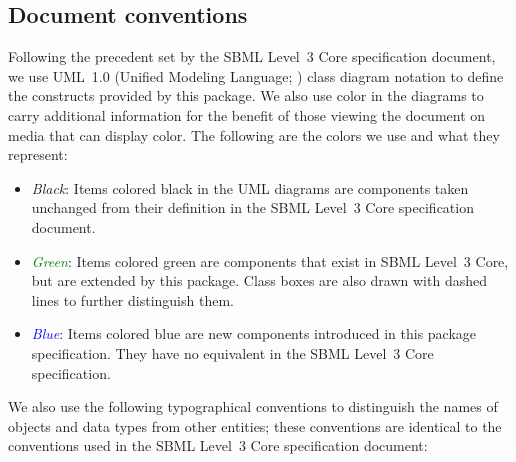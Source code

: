 \subsection{Document conventions}
\label{subsec:conventions}

Following the precedent set by the SBML Level~3 Core specification
document, we use UML~1.0 (Unified Modeling Language;
\citealt{eriksson:1998,oestereich:1999}) class diagram notation to
define the constructs provided by this package.  We also use color in
the diagrams to carry additional information for the benefit of those
viewing the document on media that can display color.  The following are
the colors we use and what they represent:

\begin{itemize}

\item[\raisebox{2.75pt}{\colorbox{black}{\rule{0.8pt}{0.8pt}}}]
  \emph{Black}: Items colored black in the UML diagrams are components
  taken unchanged from their definition in the SBML Level~3 Core
  specification document.

\item[\raisebox{2.75pt}{\colorbox{green}{\rule{0.8pt}{0.8pt}}}]
  \emph{\textcolor{green}{Green}}: Items colored green are
  components that exist in SBML Level~3 Core, but are extended by this
  package.  Class boxes are also drawn with dashed lines to further
  distinguish them.

\item[\raisebox{2.75pt}{\colorbox{blue}{\rule{0.8pt}{0.8pt}}}]
  \emph{\textcolor{blue}{Blue}}: Items colored blue are new
  components introduced in this package specification.  They have no
  equivalent in the SBML Level~3 Core specification.

\end{itemize}

We also use the following typographical conventions to distinguish the
names of objects and data types from other entities; these conventions
are identical to the conventions used in the SBML Level~3 Core specification
document:

